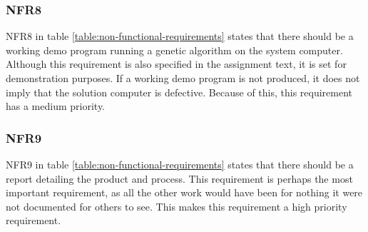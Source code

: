 \subsubsection{NFR8}

NFR8 in table \vref{table:non-functional-requirements} states that there should be a working demo program running a genetic algorithm on the system computer.
Although this requirement is also specified in the assignment text, it is set for demonstration purposes.
If a working demo program is not produced, it does not imply that the solution computer is defective.
Because of this, this requirement has a medium priority.

\subsubsection{NFR9}

NFR9 in table \vref{table:non-functional-requirements} states that there should be a report detailing the product and process.
This requirement is perhaps the most important requirement, as all the other work would have been for nothing it were not documented for others to see.
This makes this requirement a high priority requirement.
